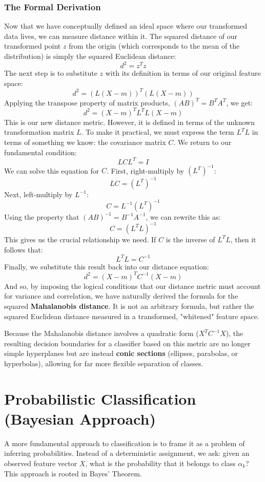 \subsubsection*{The Formal Derivation}
Now that we have conceptually defined an ideal space where our transformed data lives, we can measure distance within it. The squared distance of our transformed point $z$ from the origin (which corresponds to the mean of the distribution) is simply the squared Euclidean distance:
$$ d^2 = z^T z $$
The next step is to substitute $z$ with its definition in terms of our original feature space:
$$ d^2 = (L(X-m))^T (L(X-m)) $$
Applying the transpose property of matrix products, $(AB)^T = B^T A^T$, we get:
$$ d^2 = (X-m)^T L^T L (X-m) $$
This is our new distance metric. However, it is defined in terms of the unknown transformation matrix $L$. To make it practical, we must express the term $L^T L$ in terms of something we know: the covariance matrix $C$. We return to our fundamental condition:
$$ L C L^T = I $$
We can solve this equation for $C$. First, right-multiply by $(L^T)^{-1}$:
$$ LC = (L^T)^{-1} $$
Next, left-multiply by $L^{-1}$:
$$ C = L^{-1} (L^T)^{-1} $$
Using the property that $(AB)^{-1} = B^{-1} A^{-1}$, we can rewrite this as:
$$ C = (L^T L)^{-1} $$
This gives us the crucial relationship we need. If $C$ is the inverse of $L^T L$, then it follows that:
$$ L^T L = C^{-1} $$
Finally, we substitute this result back into our distance equation:
$$ d^2 = (X-m)^T C^{-1} (X-m) $$
And so, by imposing the logical conditions that our distance metric must account for variance and correlation, we have naturally derived the formula for the squared \textbf{Mahalanobis distance}. It is not an arbitrary formula, but rather the squared Euclidean distance measured in a transformed, "whitened" feature space.

Because the Mahalanobis distance involves a quadratic form ($X^T C^{-1} X$), the resulting decision boundaries for a classifier based on this metric are no longer simple hyperplanes but are instead \textbf{conic sections} (ellipses, parabolas, or hyperbolas), allowing for far more flexible separation of classes.
\section{Probabilistic Classification (Bayesian Approach)}
\label{sec:probabilistic_classifiers}
A more fundamental approach to classification is to frame it as a problem of inferring probabilities. Instead of a deterministic assignment, we ask: given an observed feature vector $X$, what is the probability that it belongs to class $\alpha_k$? This approach is rooted in Bayes' Theorem.

